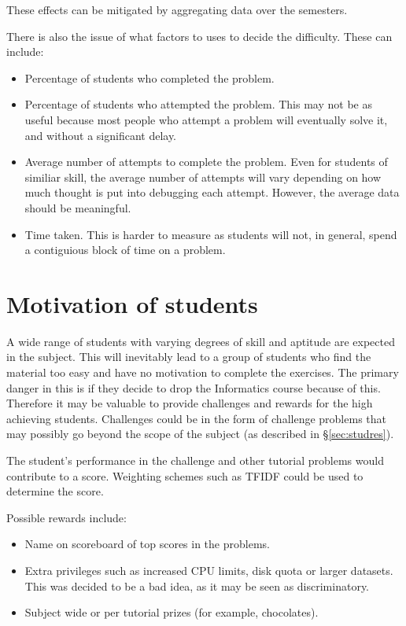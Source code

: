 These effects can be mitigated by aggregating data over the semesters.

There is also the issue of what factors to uses to decide the difficulty. These can include:
\begin{itemize}
\item Percentage of students who completed the problem.
\item Percentage of students who attempted the problem. This may not be as useful because most people who attempt a problem will eventually solve it, and without a significant delay.
\item Average number of attempts to complete the problem. Even for students of similiar skill, the average number of attempts will vary depending on how much thought is put into debugging each attempt. However, the average data should be meaningful.
\item Time taken. This is harder to measure as students will not, in general, spend a contiguious block of time on a problem.
\end{itemize}


\section{Motivation of students}
A wide range of students with varying degrees of skill and aptitude are expected in the subject. This will inevitably lead to a group of students who find the material too easy and have no motivation to complete the exercises. The primary danger in this is if they decide to drop the Informatics course because of this. Therefore it may be valuable to provide challenges and rewards for the high achieving students. Challenges could be in the form of challenge problems that may possibly go beyond the scope of the subject (as described in \S\ref{sec:studres}). 

The student's performance in the challenge and other tutorial problems would contribute to a score. Weighting schemes such as TFIDF could be used to determine the score.

Possible rewards include:
\begin{itemize}
\item Name on scoreboard of top scores in the problems.
\item Extra privileges such as increased CPU limits, disk quota or larger datasets. This was decided to be a bad idea, as it may be seen as discriminatory.
\item Subject wide or per tutorial prizes (for example, chocolates).
\end{itemize}




